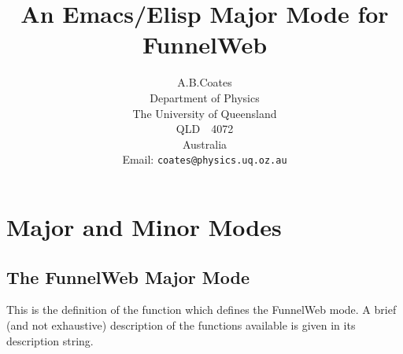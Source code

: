 \def\p#1{{\tt #1}}  %
\def\flagpage#1#2{
   \null
   \vfill
   \centerline{\fwfontboldd #1}
   \vskip 1cm
   \centerline{\fwfontboldd #2}
   \vfill
   \null
   \vfill
}





\title{
  An Emacs/Elisp Major Mode for FunnelWeb
}

\author{
  A.B.Coates \\
  Department of Physics \\
  The University of Queensland \\
  QLD\ \ 4072 \\
  Australia \\
  Email: {\tt coates@physics.uq.oz.au}
}



\maketitle

\tableofcontents

\chapter{Major and Minor Modes}

\section{The FunnelWeb Major Mode}
This is the definition of the function which defines the FunnelWeb
mode.  A brief (and not exhaustive) description of the functions
available is given in its description string.

